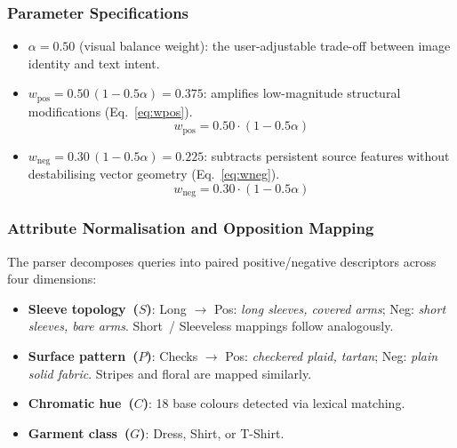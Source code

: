 \documentclass[conference]{IEEEtran}
\begin{document}
\subsubsection{Parameter Specifications}
\begin{itemize}
    \item $\alpha = 0.50$ (visual balance weight): the user-adjustable trade-off between image identity and text intent.
    \item $w_{\text{pos}} = 0.50\,(1 - 0.5\alpha) = 0.375$: amplifies low-magnitude structural modifications (Eq.~\ref{eq:wpos}).
    \begin{equation}
    w_{\text{pos}} = 0.50 \cdot (1 - 0.5\alpha)
    \label{eq:wpos}
    \end{equation}
    \item $w_{\text{neg}} = 0.30\,(1 - 0.5\alpha) = 0.225$: subtracts persistent source features without destabilising vector geometry (Eq.~\ref{eq:wneg}).
    \begin{equation}
    w_{\text{neg}} = 0.30 \cdot (1 - 0.5\alpha)
    \label{eq:wneg}
    \end{equation}
\end{itemize}

\subsubsection{Attribute Normalisation and Opposition Mapping}
The parser decomposes queries into paired positive/negative descriptors across four dimensions:
\begin{itemize}
    \item \textbf{Sleeve topology~($S$)}: Long $\rightarrow$ Pos: \textit{long sleeves, covered arms}; Neg: \textit{short sleeves, bare arms}. Short~/ Sleeveless mappings follow analogously.
    \item \textbf{Surface pattern~($P$)}: Checks $\rightarrow$ Pos: \textit{checkered plaid, tartan}; Neg: \textit{plain solid fabric}. Stripes and floral are mapped similarly.
    \item \textbf{Chromatic hue~($C$)}: 18 base colours detected via lexical matching.
    \item \textbf{Garment class~($G$)}: Dress, Shirt, or T-Shirt.
\end{itemize}
\end{document}
